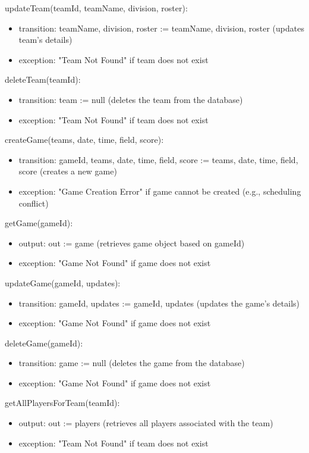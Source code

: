 \documentclass[12pt, titlepage]{article}
\begin{document}
\noindent updateTeam(teamId, teamName, division, roster):
\begin{itemize}
  \item transition: teamName, division, roster := teamName, division, roster (updates team's details)
  \item exception: "Team Not Found" if team does not exist
\end{itemize}

\noindent deleteTeam(teamId):
\begin{itemize}
  \item transition: team := null (deletes the team from the database)
  \item exception: "Team Not Found" if team does not exist
\end{itemize}

\noindent createGame(teams, date, time, field, score):
\begin{itemize}
  \item transition: gameId, teams, date, time, field, score := teams, date, time, field, score (creates a new game)
  \item exception: "Game Creation Error" if game cannot be created (e.g., scheduling conflict)
\end{itemize}

\noindent getGame(gameId):
\begin{itemize}
  \item output: out := game (retrieves game object based on gameId)
  \item exception: "Game Not Found" if game does not exist
\end{itemize}

\noindent updateGame(gameId, updates):
\begin{itemize}
  \item transition: gameId, updates := gameId, updates (updates the game's details)
  \item exception: "Game Not Found" if game does not exist
\end{itemize}

\noindent deleteGame(gameId):
\begin{itemize}
  \item transition: game := null (deletes the game from the database)
  \item exception: "Game Not Found" if game does not exist
\end{itemize}

\noindent getAllPlayersForTeam(teamId):
\begin{itemize}
  \item output: out := players (retrieves all players associated with the team)
  \item exception: "Team Not Found" if team does not exist
\end{itemize}
\end{document}

